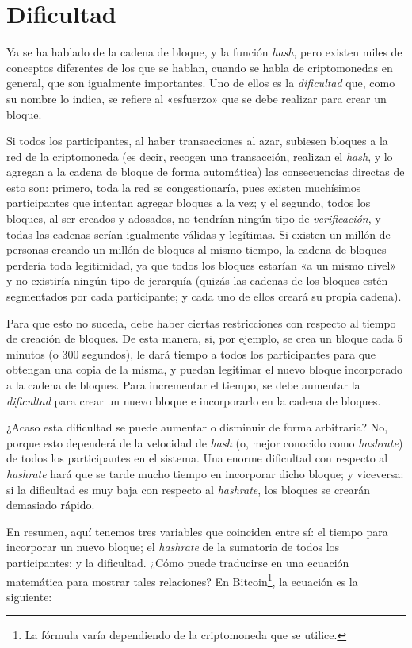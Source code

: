 \documentclass[12pt,a4paper,twoside]{book}
\begin{document}
\section{Dificultad}
Ya se ha hablado de la cadena de bloque, y la función \textit{hash}, pero existen miles de conceptos diferentes de los que se hablan, cuando se habla de criptomonedas en general, que son igualmente importantes. Uno de ellos es la \textit{dificultad} que, como su nombre lo indica, se refiere al «esfuerzo» que se debe realizar para crear un bloque.

Si todos los participantes, al haber transacciones al azar, subiesen bloques a la red de la criptomoneda (es decir, recogen una transacción, realizan el \textit{hash}, y lo agregan a la cadena de bloque de forma automática) las consecuencias directas de esto son: primero, toda la red se congestionaría, pues existen muchísimos participantes que intentan agregar bloques a la vez; y el segundo, todos los bloques, al ser creados y adosados, no tendrían ningún tipo de \textit{verificación}, y todas las cadenas serían igualmente válidas y legítimas. Si existen un millón de personas creando un millón de bloques al mismo tiempo, la cadena de bloques perdería toda legitimidad, ya que todos los bloques estarían «a un mismo nivel» y no existiría ningún tipo de jerarquía (quizás las cadenas de los bloques estén segmentados por cada participante; y cada uno de ellos creará su propia cadena).

Para que esto no suceda, debe haber ciertas restricciones con respecto al tiempo de creación de bloques. De esta manera, si, por ejemplo, se crea un bloque cada 5 minutos (o 300 segundos), le dará tiempo a todos los participantes para que obtengan una copia de la misma, y puedan legitimar el nuevo bloque incorporado a la cadena de bloques. Para incrementar el tiempo, se debe aumentar la \textit{dificultad} para crear un nuevo bloque e incorporarlo en la cadena de bloques.

¿Acaso esta dificultad se puede aumentar o disminuir de forma arbitraria? No, porque esto dependerá de la velocidad de \textit{hash} (o, mejor conocido como \textit{hashrate}) de todos los participantes en el sistema. Una enorme dificultad con respecto al \textit{hashrate} hará que se tarde mucho tiempo en incorporar dicho bloque; y viceversa: si la dificultad es muy baja con respecto al \textit{hashrate}, los bloques se crearán demasiado rápido.

En resumen, aquí tenemos tres variables que coinciden entre sí: el tiempo para incorporar un nuevo bloque; el \textit{hashrate} de la sumatoria de todos los participantes; y la dificultad. ¿Cómo puede traducirse en una ecuación matemática para mostrar tales relaciones? En Bitcoin\footnote{La fórmula varía dependiendo de la criptomoneda que se utilice.}, la ecuación es la siguiente:
\end{document}
